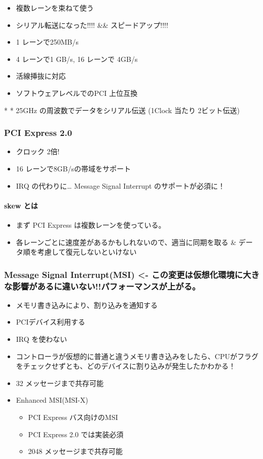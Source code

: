 \documentclass{jsarticle}
\begin{document}
\begin{itemize}
\item
  複数レーンを束ねて使う
\item
  シリアル転送になった!!!! \&\& スピードアップ!!!!
\item
  1 レーンで250MB/s
\item
  4 レーンで1 GB/s, 16 レーンで 4GB/s
\item
  活線挿抜に対応
\item
  ソフトウェアレベルでのPCI 上位互換
\end{itemize}
* * 25GHz の周波数でデータをシリアル伝送 (1Clock 当たり 2ビット伝送)

\subsubsection{PCI Express 2.0}

\begin{itemize}
\item
  クロック 2倍!
\item
  16 レーンで8GB/sの帯域をサポート
\item
  IRQ の代わりに\ldots{} Message Signal Interrupt のサポートが必須に！
\end{itemize}
\paragraph{skew とは}

\begin{itemize}
\item
  まず PCI Express は複数レーンを使っている。
\item
  各レーンごとに速度差があるかもしれないので、適当に同期を取る \&
  データ順を考慮して復元しないといけない
\end{itemize}
\subsubsection{Message Signal Interrupt(MSI) \textless{}-
この変更は仮想化環境に大きな影響があるに違いない!!パフォーマンスが上がる。}

\begin{itemize}
\item
  メモリ書き込みにより、割り込みを通知する
\item
  PCIデバイス利用する
\item
  IRQ を使わない
\item
  コントローラが仮想的に普通と違うメモリ書き込みをしたら、CPUがフラグをチェックせずとも、どのデバイスに割り込みが発生したかわかる！
\item
  32 メッセージまで共存可能
\item
  Enhanced MSI(MSI-X)
  \begin{itemize}
  \item
    PCI Express バス向けのMSI
  \item
    PCI Express 2.0 では実装必須
  \item
    2048 メッセージまで共存可能
  \end{itemize}
\end{itemize}
\end{document}
